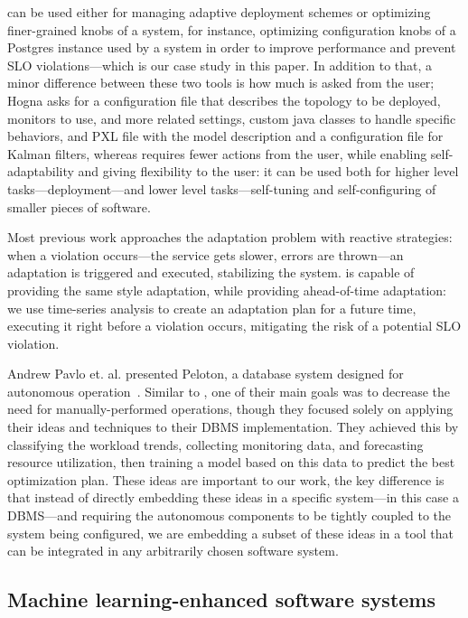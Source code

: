 \projectname{} can be used either for managing adaptive deployment schemes or optimizing finer-grained knobs of a system, for instance, optimizing configuration knobs of a Postgres instance used by a system in order to improve performance and prevent SLO violations---which is our case study in this paper. In addition to that, a minor difference between these two tools is how much is asked from the user; Hogna asks for a configuration file that describes the topology to be deployed, monitors to use, and more related settings, custom java classes to handle specific behaviors, and PXL file with the model description and a configuration file for Kalman filters, whereas \projectname{} requires fewer actions from the user, while enabling self-adaptability and giving flexibility to the user: it can be used both for higher level tasks---deployment---and lower level tasks---self-tuning and self-configuring of smaller pieces of software.

Most previous work approaches the adaptation problem with reactive strategies: when a violation occurs---the service gets slower, errors are thrown---an adaptation is triggered and executed, stabilizing the system. \projectname{} is capable of providing the same style adaptation, while providing ahead-of-time adaptation: we use time-series analysis to create an adaptation plan for a future time, executing it right before a violation occurs, mitigating the risk of a potential SLO violation. 

Andrew Pavlo et. al. presented Peloton, a database system designed for autonomous operation~\cite{andrew_pavlo_self-driving_2017}. Similar to \projectname{}, one of their main goals was to decrease the need for manually-performed operations, though they focused solely on applying their ideas and techniques to their DBMS implementation. They achieved this by classifying the workload trends, collecting monitoring data, and forecasting resource utilization, then training a model based on this data to predict the best optimization plan. These ideas are important to our work, the key difference is that instead of directly embedding these ideas in a specific system---in this case a DBMS---and requiring the autonomous components to be tightly coupled to the system being configured, we are embedding a subset of these ideas in a tool that can be integrated in any arbitrarily chosen software system.

\subsection{Machine learning-enhanced software systems}

